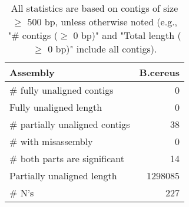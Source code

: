 \documentclass[12pt,a4paper]{article}
\begin{document}
\begin{table}[ht]
\begin{center}
\caption{All statistics are based on contigs of size $\geq$ 500 bp, unless otherwise noted (e.g., "\# contigs ($\geq$ 0 bp)" and "Total length ($\geq$ 0 bp)" include all contigs).}
\begin{tabular}{|l*{1}{|r}|}
\hline
Assembly & B.cereus \\ \hline
\# fully unaligned contigs & 0 \\ \hline
Fully unaligned length & 0 \\ \hline
\# partially unaligned contigs & 38 \\ \hline
\hspace{5mm}\# with misassembly & 0 \\ \hline
\hspace{5mm}\# both parts are significant & 14 \\ \hline
Partially unaligned length & 1298085 \\ \hline
\# N's & 227 \\ \hline
\end{tabular}
\end{center}
\end{table}
\end{document}
